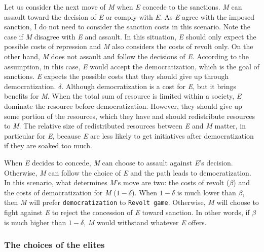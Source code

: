\documentclass[11pt, letterpage]{article}
\begin{document}
Let us consider the next move of \textit{M} when \textit{E} concede to the sanctions. \textit{M} can assault toward the decision of \textit{E} or comply with \textit{E}. As \textit{E} agree with the imposed sanction, I do not need to consider the sanction costs in this scenario. Note the case if \textit{M} disagree with \textit{E} and assault. In this situation, \textit{E} should only expect the possible costs of repression and \textit{M} also considers the costs of revolt only. On the other hand, \textit{M} does not assault and follow the decisions of \textit{E}. According to the assumption, in this case, \textit{E} would accept the democratization, which is the goal of sanctions. \textit{E} expects the possible costs that they should give up through democratization. $\delta$. Although democratization is a cost for \textit{E}, but it brings benefits for \textit{M}. When the total sum of resource is limited within a society, \textit{E} dominate the resource before democratization. However, they should give up some portion of the resources, which they have and should redistribute resources to \textit{M}. The relative size of redistributed resources between \textit{E} and \textit{M} matter, in particular for \textit{E}, because \textit{E} are less likely to get initiatives after democratization if they are soaked too much. 

When \textit{E} decides to concede, \textit{M} can choose to assault against \textit{E}'s decision. Otherwise, \textit{M} can follow the choice of \textit{E} and the path leads to democratization. In this scenario, what determines \textit{M}'s move are two: the costs of revolt ($\beta$) and the costs of democratization for \textit{M} ($1-\delta$). When $1-\delta$ is much lower than $\beta$, then \textit{M} will prefer \texttt{democratization} to \texttt{Revolt game}. Otherwise, \textit{M} will choose to fight against \textit{E} to reject the concession of \textit{E} toward sanction. In other words, if $\beta$ is much higher than $1-\delta$, \textit{M} would withstand whatever \textit{E} offers.
	
\subsubsection*{The choices of the elites}
\end{document}
